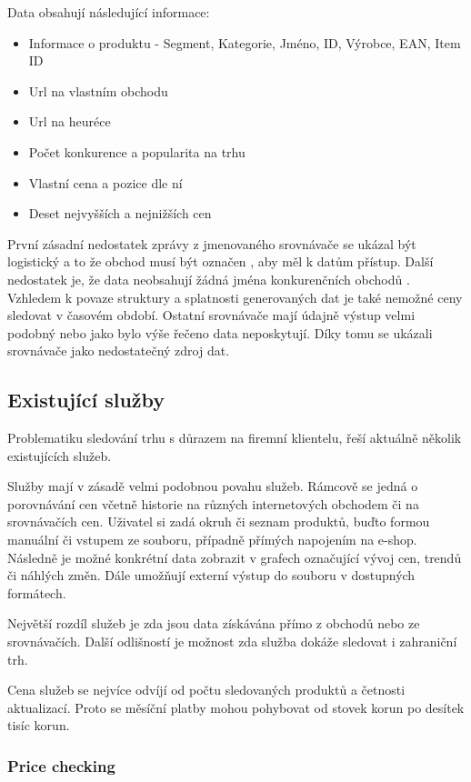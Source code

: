\documentclass[thesis=B,czech]{FITthesis}[2012/06/26]
\begin{document}
Data obsahují následující informace:
\begin{itemize}
\item Informace o produktu - Segment, Kategorie, Jméno, ID, Výrobce, EAN, Item ID
\item Url na vlastním obchodu
\item Url na heuréce
\item Počet konkurence a popularita na trhu
\item Vlastní cena a pozice dle ní
\item Deset nejvyšších a nejnižších cen
\end{itemize}



První zásadní nedostatek zprávy z jmenovaného srovnávače se ukázal být logistický a to že obchod musí být označen ,
aby měl k datům přístup. Další nedostatek je, že data neobsahují žádná jména konkurenčních obchodů \cite{heureka-report}.
Vzhledem k povaze struktury a splatnosti generovaných dat je také nemožné ceny sledovat v časovém období.
Ostatní srovnávače mají údajně výstup velmi podobný nebo jako bylo výše řečeno data neposkytují. Díky tomu se ukázali
srovnávače jako nedostatečný zdroj dat.\cite{hunka}


\subsection{Existující služby}

Problematiku sledování trhu s důrazem na firemní klientelu, řeší aktuálně několik existujících služeb.
\par
Služby mají v zásadě velmi podobnou povahu služeb. Rámcově se jedná o porovnávání cen včetně historie na různých internetových
obchodem či na srovnávačích cen. Uživatel si zadá okruh či seznam produktů, buďto formou manuální či vstupem ze souboru, případně 
přímých napojením na e-shop. Následně je možné konkrétní data zobrazit v grafech označující vývoj cen, trendů či náhlých změn.
Dále umožňují externí výstup do souboru v dostupných formátech.
\par
Největší rozdíl služeb je zda jsou data získávána přímo z obchodů nebo ze srovnávačích. Další odlišností je 
možnost zda služba dokáže sledovat i zahraniční trh.
\par
Cena služeb se nejvíce odvíjí od počtu sledovaných produktů a četnosti aktualizací. Proto se měsíční platby mohou 
pohybovat od stovek korun po desítek tisíc korun.

\subsubsection{Price checking}
\end{document}
